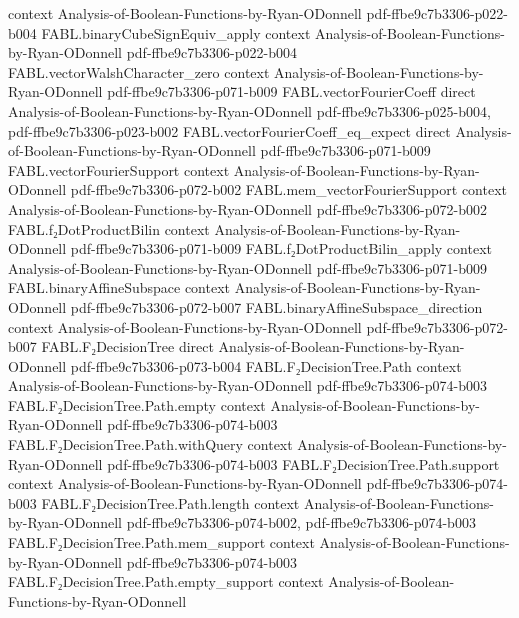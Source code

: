 \begin{theorem}
  {context}
  {Analysis-of-Boolean-Functions-by-Ryan-ODonnell}
  {pdf-ffbe9c7b3306-p022-b004}
\proofstep
  {FABL.binaryCubeSignEquiv_apply}
  {context}
  {Analysis-of-Boolean-Functions-by-Ryan-ODonnell}
  {pdf-ffbe9c7b3306-p022-b004}
\proofstep
  {FABL.vectorWalshCharacter_zero}
  {context}
  {Analysis-of-Boolean-Functions-by-Ryan-ODonnell}
  {pdf-ffbe9c7b3306-p071-b009}
\proofstep
  {FABL.vectorFourierCoeff}
  {direct}
  {Analysis-of-Boolean-Functions-by-Ryan-ODonnell}
  {pdf-ffbe9c7b3306-p025-b004,
    pdf-ffbe9c7b3306-p023-b002}
\proofstep
  {FABL.vectorFourierCoeff_eq_expect}
  {direct}
  {Analysis-of-Boolean-Functions-by-Ryan-ODonnell}
  {pdf-ffbe9c7b3306-p071-b009}
\proofstep
  {FABL.vectorFourierSupport}
  {context}
  {Analysis-of-Boolean-Functions-by-Ryan-ODonnell}
  {pdf-ffbe9c7b3306-p072-b002}
\proofstep
  {FABL.mem_vectorFourierSupport}
  {context}
  {Analysis-of-Boolean-Functions-by-Ryan-ODonnell}
  {pdf-ffbe9c7b3306-p072-b002}
\proofstep
  {FABL.f₂DotProductBilin}
  {context}
  {Analysis-of-Boolean-Functions-by-Ryan-ODonnell}
  {pdf-ffbe9c7b3306-p071-b009}
\proofstep
  {FABL.f₂DotProductBilin_apply}
  {context}
  {Analysis-of-Boolean-Functions-by-Ryan-ODonnell}
  {pdf-ffbe9c7b3306-p071-b009}
\proofstep
  {FABL.binaryAffineSubspace}
  {context}
  {Analysis-of-Boolean-Functions-by-Ryan-ODonnell}
  {pdf-ffbe9c7b3306-p072-b007}
\proofstep
  {FABL.binaryAffineSubspace_direction}
  {context}
  {Analysis-of-Boolean-Functions-by-Ryan-ODonnell}
  {pdf-ffbe9c7b3306-p072-b007}
\proofstep
  {FABL.F₂DecisionTree}
  {direct}
  {Analysis-of-Boolean-Functions-by-Ryan-ODonnell}
  {pdf-ffbe9c7b3306-p073-b004}
\proofstep
  {FABL.F₂DecisionTree.Path}
  {context}
  {Analysis-of-Boolean-Functions-by-Ryan-ODonnell}
  {pdf-ffbe9c7b3306-p074-b003}
\proofstep
  {FABL.F₂DecisionTree.Path.empty}
  {context}
  {Analysis-of-Boolean-Functions-by-Ryan-ODonnell}
  {pdf-ffbe9c7b3306-p074-b003}
\proofstep
  {FABL.F₂DecisionTree.Path.withQuery}
  {context}
  {Analysis-of-Boolean-Functions-by-Ryan-ODonnell}
  {pdf-ffbe9c7b3306-p074-b003}
\proofstep
  {FABL.F₂DecisionTree.Path.support}
  {context}
  {Analysis-of-Boolean-Functions-by-Ryan-ODonnell}
  {pdf-ffbe9c7b3306-p074-b003}
\proofstep
  {FABL.F₂DecisionTree.Path.length}
  {context}
  {Analysis-of-Boolean-Functions-by-Ryan-ODonnell}
  {pdf-ffbe9c7b3306-p074-b002,
    pdf-ffbe9c7b3306-p074-b003}
\proofstep
  {FABL.F₂DecisionTree.Path.mem_support}
  {context}
  {Analysis-of-Boolean-Functions-by-Ryan-ODonnell}
  {pdf-ffbe9c7b3306-p074-b003}
\proofstep
  {FABL.F₂DecisionTree.Path.empty_support}
  {context}
  {Analysis-of-Boolean-Functions-by-Ryan-ODonnell}

\end{theorem}
